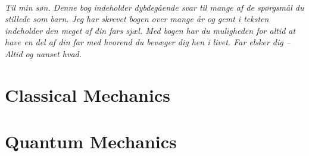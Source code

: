 \documentclass[a4paper,11pt,twoside]{book}
\theoremstyle{definition}
\begin{document}
	\frontmatter
	\newpage
	\hypersetup{pageanchor=false}
	
	\hypersetup{pageanchor=true}
	
	\renewcommand{\sectionmark}[1]{\markboth{}{\emph{\thesection~#1}}}
	\renewcommand{\subsectionmark}[1]{}%
	
	\newpage
	\thispagestyle{plain}
	~\\~\\~\\~\\~\\~\\~\\~\\~\\~\\~\\~\\~\\~\\~\\~\\~\\~\\	
	\begin{center}
		\emph{Til min søn. Denne bog indeholder dybdegående svar til mange af de spørgsmål du stillede som barn. Jeg har skrevet bogen over mange år og gemt i teksten indeholder den meget af din fars sjæl. Med bogen har du muligheden for altid at have en del af din far med hvorend du bevæger dig hen i livet. Far elsker dig -- Altid og uanset hvad.}
	\end{center}

	\let\cleardoublepage\clearpage %
	\newpage
	\tableofcontents

	\mainmatter
	\thispagestyle{plain}
	
	

	\part{Classical Mechanics}
		
	
	\part{Quantum Mechanics}
		
	
\end{document}
